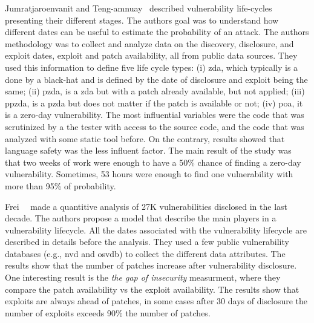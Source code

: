 Jumratjaroenvanit and Teng-amnuay~\cite{Jumratjaroenvanit:2008} described vulnerability life-cycles presenting their different stages. 
The authors goal was to understand how different dates can be useful to estimate the probability of an attack. 
The authors methodology was to collect and analyze data on the discovery, disclosure, and exploit dates, exploit and patch availability, all from public data sources. 
They used this information to define five life cycle types: (i) \gls{zda}, which typically is a done by a black-hat and is defined by the date of disclosure and exploit being the same; (ii) \gls{pzda}, is a \gls{zda} but with a patch already available, but not applied; 
(iii) \gls{ppzda}, is a \gls{pzda} but does not matter if the patch is available or not; 
(iv) \gls{poa}, it is a zero-day vulnerability. 
The most influential variables were the code that was scrutinized by a the tester with access to the source code, and the code that was analyzed with some static tool before. 
On the contrary, results showed that language safety was the less influent factor. 
The main result of the study was that two weeks of work were enough to have a 50\% chance of finding a zero-day vulnerability. 
Sometimes, 53 hours were enough to find one vulnerability with more than 95\% of probability.


Frei~\etal{}~\cite{Frei:2010} made a quantitive analysis of 27K vulnerabilities disclosed in the last decade.
The authors propose a model that describe the main players in a vulnerability lifecycle.
All the dates associated with the vulnerability lifecycle are described in details before the analysis.
They used a few public vulnerability databases (e.g., \gls{nvd} and \gls{osvdb}) to collect the different data attributes.
The results show that the number of patches increase after vulnerability disclosure.  
One interesting result is the \emph{the gap of insecurity} measurment, where they compare the patch availability vs the exploit availability. 
The results show that exploits are always ahead of patches, in some cases after 30 days of disclosure the number of exploits exceeds 90\% the number of patches.



